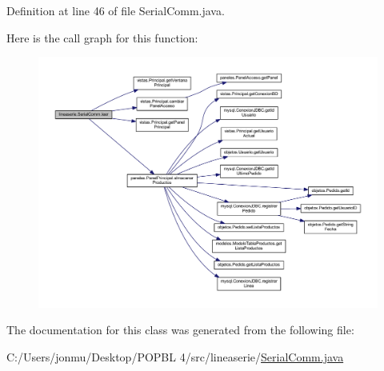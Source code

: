 Definition at line 46 of file Serial\+Comm.\+java.

Here is the call graph for this function\+:\nopagebreak
\begin{figure}[H]
\begin{center}
\leavevmode
\includegraphics[width=350pt]{classlineaserie_1_1_serial_comm_a9e5dc899a435cb7bbd14c50af1e69a9e_cgraph}
\end{center}
\end{figure}


The documentation for this class was generated from the following file\+:\begin{DoxyCompactItemize}
\item 
C\+:/\+Users/jonmu/\+Desktop/\+P\+O\+P\+B\+L 4/src/lineaserie/\mbox{\hyperlink{_serial_comm_8java}{Serial\+Comm.\+java}}\end{DoxyCompactItemize}
